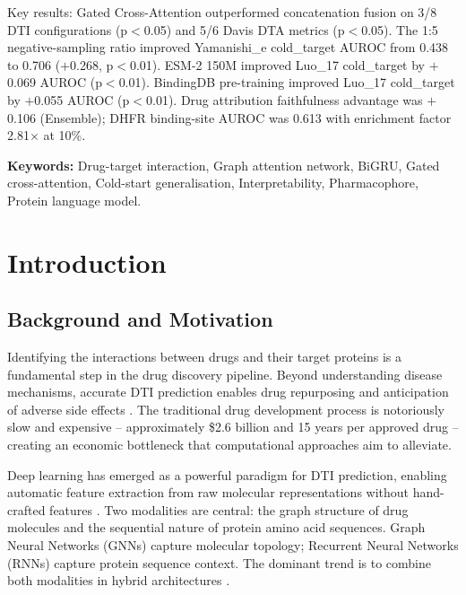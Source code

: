 \documentclass[12pt,a4paper,oneside]{report}
\begin{document}
Key results: Gated Cross-Attention outperformed concatenation fusion on 3/8 DTI configurations (p${<}$0.05) and 5/6 Davis DTA metrics (p${<}$0.05). The 1:5 negative-sampling ratio improved Yamanishi\_e cold\_target AUROC from 0.438 to 0.706 ($+$0.268, p${<}$0.01). ESM-2 150M improved Luo\_17 cold\_target by $+$0.069 AUROC (p${<}$0.01). BindingDB pre-training improved Luo\_17 cold\_target by $+$0.055 AUROC (p${<}$0.01). Drug attribution faithfulness advantage was $+$0.106 (Ensemble); DHFR binding-site AUROC was 0.613 with enrichment factor 2.81$\times$ at 10\%.

\textbf{Keywords:} Drug-target interaction, Graph attention network, BiGRU, Gated cross-attention, Cold-start generalisation, Interpretability, Pharmacophore, Protein language model.

\tableofcontents
\listoftables
\clearpage

\chapter{Introduction}

\section{Background and Motivation}

Identifying the interactions between drugs and their target proteins is a fundamental step in the drug discovery pipeline. Beyond understanding disease mechanisms, accurate DTI prediction enables drug repurposing and anticipation of adverse side effects \citep{tanoli2025, yang2024mindg}. The traditional drug development process is notoriously slow and expensive -- approximately \$2.6 billion and 15 years per approved drug \citep{khojasteh2023} -- creating an economic bottleneck that computational approaches aim to alleviate.

Deep learning has emerged as a powerful paradigm for DTI prediction, enabling automatic feature extraction from raw molecular representations without hand-crafted features \citep{vefghi2025}. Two modalities are central: the graph structure of drug molecules and the sequential nature of protein amino acid sequences. Graph Neural Networks (GNNs) capture molecular topology; Recurrent Neural Networks (RNNs) capture protein sequence context. The dominant trend is to combine both modalities in hybrid architectures \citep{panahandeh2025, shan2025}.
\end{document}
